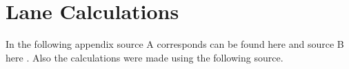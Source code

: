 \chapter{Lane Calculations} \label{laneCalculations}
In the following appendix source A corresponds can be found here \cite{DriveingCurves} and source B here  \cite{roadRules}. Also the calculations were made using the following source\cite{turningRadius}.

